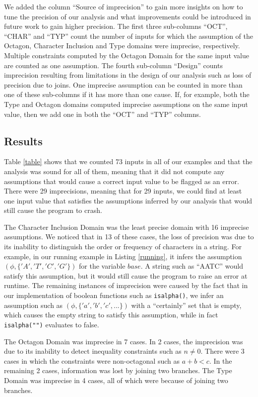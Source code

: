 \documentclass[10pt]{report}
\begin{document}
We added the column ``Source of imprecision'' to gain more insights on how to tune the precision of our analysis and what improvements could be introduced in future work to gain higher precision. The first three sub-columns ``OCT'', ``CHAR'' and ``TYP'' count the number of inputs for which the assumption of the Octagon, Character Inclusion and Type domains were imprecise, respectively. Multiple constraints computed by the Octagon Domain for the same input value are counted as one assumption. The fourth sub-column ``Design'' counts imprecision resulting from limitations in the design of our analysis such as loss of precision due to joins. One imprecise assumption can be counted in more than one of these sub-columns if it has more than one cause. If, for example, both the Type and Octagon domains computed imprecise assumptions on the same input value, then we add one in both the ``OCT'' and ``TYP'' columns.  

\subsection{Results}
Table \ref{table} shows that we counted 73 inputs in all of our examples and that the analysis was sound for all of them, meaning that it did not compute any assumptions that would cause a correct input value to be flagged as an error. There were 29 imprecisions, meaning that for 29 inputs, we could find at least one input value that satisfies the assumptions inferred by our analysis that would still cause the program to crash. 

The Character Inclusion Domain was the least precise domain with 16 imprecise assumptions. We noticed that in 13 of these cases, the loss of precision was due to its inability to distinguish the order or frequency of characters  in a string. For example, in our running example in Listing \ref{running}, it infers the assumption $ (\phi, \lbrace 'A', 'T', 'C', 'G' \rbrace )$ for the variable $ base $. A string such as ``AATC'' would satisfy this assumption, but it would still cause the program to raise an error at runtime. The remaining instances of imprecision were caused by the fact that in our implementation of boolean functions such as \verb|isalpha()|, we infer an assumption such as $ (\phi, \lbrace 'a', 'b', 'c', ...\rbrace ) $ with a ``certainly'' set that is empty, which causes the empty string to satisfy this assumption, while in fact \verb|isalpha("")| evaluates to false. 

The Octagon Domain was imprecise in 7 cases. In 2 cases, the imprecision was due to its inability to detect inequality constraints such as $ n \neq 0 $. There were 3 cases in which the constraints were non-octagonal such as $ a + b < c $. In the remaining 2 cases, information was lost by joining two branches. The Type Domain was imprecise in 4 cases, all of which were because of joining two branches. 
\end{document}

